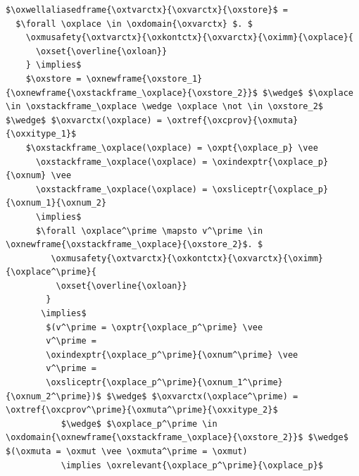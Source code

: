 \begin{lstlisting}
$\oxwellaliasedframe{\oxtvarctx}{\oxvarctx}{\oxstore}$ =
  $\forall \oxplace \in \oxdomain{\oxvarctx} $. $
    \oxmusafety{\oxtvarctx}{\oxkontctx}{\oxvarctx}{\oximm}{\oxplace}{
      \oxset{\overline{\oxloan}}
    } \implies$
    $\oxstore = \oxnewframe{\oxstore_1}{\oxnewframe{\oxstackframe_\oxplace}{\oxstore_2}}$ $\wedge$ $\oxplace \in \oxstackframe_\oxplace \wedge \oxplace \not \in \oxstore_2$ $\wedge$ $\oxvarctx(\oxplace) = \oxtref{\oxcprov}{\oxmuta}{\oxxitype_1}$
    $\oxstackframe_\oxplace(\oxplace) = \oxpt{\oxplace_p} \vee
      \oxstackframe_\oxplace(\oxplace) = \oxindexptr{\oxplace_p}{\oxnum} \vee
      \oxstackframe_\oxplace(\oxplace) = \oxsliceptr{\oxplace_p}{\oxnum_1}{\oxnum_2}
      \implies$
      $\forall \oxplace^\prime \mapsto v^\prime \in \oxnewframe{\oxstackframe_\oxplace}{\oxstore_2}$. $
         \oxmusafety{\oxtvarctx}{\oxkontctx}{\oxvarctx}{\oximm}{\oxplace^\prime}{
          \oxset{\overline{\oxloan}}
        }
       \implies$
        $(v^\prime = \oxptr{\oxplace_p^\prime} \vee
        v^\prime =
        \oxindexptr{\oxplace_p^\prime}{\oxnum^\prime} \vee
        v^\prime =
        \oxsliceptr{\oxplace_p^\prime}{\oxnum_1^\prime}{\oxnum_2^\prime})$ $\wedge$ $\oxvarctx(\oxplace^\prime) = \oxtref{\oxcprov^\prime}{\oxmuta^\prime}{\oxxitype_2}$
           $\wedge$ $\oxplace_p^\prime \in \oxdomain{\oxnewframe{\oxstackframe_\oxplace}{\oxstore_2}}$ $\wedge$ $(\oxmuta = \oxmut \vee \oxmuta^\prime = \oxmut)
           \implies \oxrelevant{\oxplace_p^\prime}{\oxplace_p}$
\end{lstlisting}

